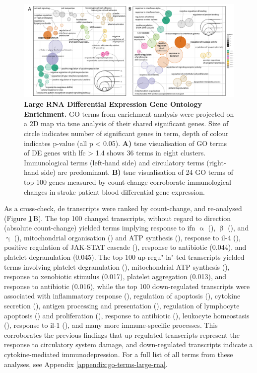 \begin{figure}
\includegraphics[width=\textwidth]{figures/gsoap-de}
\caption[Large RNA Differential Expression Gene Ontology Enrichment.]{\textbf{Large RNA Differential Expression Gene Ontology Enrichment.} GO terms from enrichment analysis were projected on a 2D map via \acf{tsne} analysis of their shared significant genes. Size of circle indicates number of significant genes in term, depth of colour indicates p-value (all p < 0.05). \textbf{A)} \ac{tsne} visualisation of GO terms of DE genes with \ac{lfc} > 1.4 shows 36 terms in eight clusters. Immunological terms (left-hand side) and circulatory terms (right-hand side) are predominant. \textbf{B)} \ac{tsne} visualisation of 24 GO terms of top 100 genes measured by count-change corroborate immunological changes in stroke patient blood differential gene expression.
\label{fig:gsoap-de}}
\end{figure}

As a cross-check, \ac{de} transcripts were ranked by count-change, and re-analysed (Figure \ref{fig:gsoap-de}\,B). The top 100 changed transcripts, without regard to direction (absolute count-change) yielded terms implying response to \ac{ifn} $\upalpha$ (), $\upbeta$ (), and $\upgamma$ (), mitochondrial organisation () and ATP synthesis (), response to \ac{il}-4 (), positive regulation of JAK-STAT cascade (), response to antibiotic (0.044), and platelet degranulation (0.045). The top 100 up-regu"-la"-ted transcripts yielded terms involving platelet degranulation (), mitochondrial ATP synthesis (), response to xenobiotic stimulus (0.017), platelet aggregation (0.013), and response to antibiotic (0.016), while the top 100 down-regulated transcripts were associated with inflammatory response (), regulation of apoptosis (), cytokine secretion (), antigen processing and presentation (), regulation of lymphocyte apoptosis () and proliferation (), response to antibiotic (), leukocyte homeostasis (), response to \ac{il}-1 (), and many more immune-specific processes. This corroborates the previous findings that up-regulated transcripts represent the response to circulatory system damage, and down-regulated transcripts indicate a cytokine-mediated immunodepression. For a full list of all terms from these analyses, see Appendix \ref{appendix:go-terms-large-rna}. 

